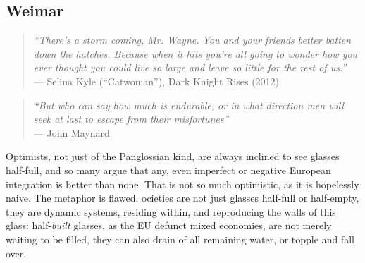 \documentclass[11pt,a4paper,oneside,openright]{article}
\begin{document}



\subsection[Weimar]{Weimar}

\begin{quote}
	\emph{``There’s a storm coming, Mr. Wayne. 
	You and your friends better batten down the hatches. 
	Because when it hits you’re all going to wonder how you ever thought you could live so large and leave so little for the rest of us.''}\\
	--- Selina Kyle (``Catwoman''), Dark Knight Rises (2012)
\end{quote}

\begin{quote}
	\emph{``But who can say how much is endurable, or in what direction men will seek at last to escape from their misfortunes''}\\
	--- John Maynard \cite{Keynes1936}
\end{quote}

Optimists, not just of the Panglossian kind, are always inclined to see glasses half-full, and so many argue that any, even imperfect or negative European integration is better than none. 
That is not so much optimistic, as it is hopelessly naive. 
The metaphor is flawed. 
 ocieties are not just glasses half-full or half-empty, they are dynamic systems, residing within, and reproducing the walls of this glass: 
 half-\emph{built} glasses, as the \gls{EU} defunct mixed economies, are not merely waiting to be filled, they can also drain of all remaining water, or topple and fall over.
\end{document}
